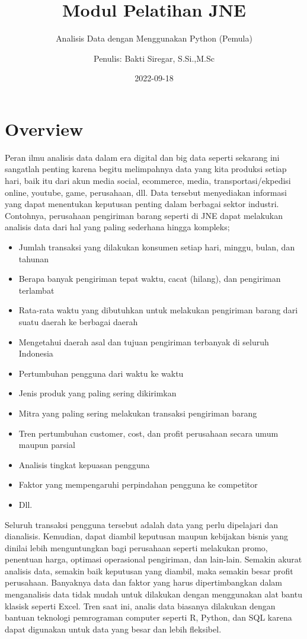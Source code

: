 \documentclass[
]{docs}
\title{Modul Pelatihan JNE}
\subtitle{Analisis Data dengan Menggunakan Python (Pemula)}
\author{Penulis: Bakti Siregar, S.Si.,M.Sc}
\date{2022-09-18}
\providecommand{\tightlist}{%
  \setlength{\itemsep}{0pt}\setlength{\parskip}{0pt}}
\begin{document}
\maketitle

{
\setcounter{tocdepth}{2}
\tableofcontents
}
\hypertarget{overview}{%
\section*{Overview}\label{overview}}

Peran ilmu analisis data dalam era digital dan big data seperti sekarang ini sangatlah penting karena begitu melimpahnya data yang kita produksi setiap hari, baik itu dari akun media social, ecommerce, media, transportasi/ekpedisi online, youtube, game, perusahaan, dll. Data tersebut menyediakan informasi yang dapat menentukan keputusan penting dalam berbagai sektor industri. Contohnya, perusahaan pengiriman barang seperti di JNE dapat melakukan analisis data dari hal yang paling sederhana hingga kompleks;

\begin{itemize}
\tightlist
\item
  Jumlah transaksi yang dilakukan konsumen setiap hari, minggu, bulan, dan tahunan
\item
  Berapa banyak pengiriman tepat waktu, cacat (hilang), dan pengiriman terlambat
\item
  Rata-rata waktu yang dibutuhkan untuk melakukan pengiriman barang dari suatu daerah ke berbagai daerah
\item
  Mengetahui daerah asal dan tujuan pengiriman terbanyak di seluruh Indonesia
\item
  Pertumbuhan pengguna dari waktu ke waktu
\item
  Jenis produk yang paling sering dikirimkan
\item
  Mitra yang paling sering melakukan transaksi pengiriman barang
\item
  Tren pertumbuhan customer, cost, dan profit perusahaan secara umum maupun parsial
\item
  Analisis tingkat kepuasan pengguna
\item
  Faktor yang mempengaruhi perpindahan pengguna ke competitor
\item
  Dll.
\end{itemize}

Seluruh transaksi pengguna tersebut adalah data yang perlu dipelajari dan dianalisis. Kemudian, dapat diambil keputusan maupun kebijakan bisnis yang dinilai lebih menguntungkan bagi perusahaan seperti melakukan promo, penentuan harga, optimasi operasional pengiriman, dan lain-lain. Semakin akurat analisis data, semakin baik keputusan yang diambil, maka semakin besar profit perusahaan. Banyaknya data dan faktor yang harus dipertimbangkan dalam menganalisis data tidak mudah untuk dilakukan dengan menggunakan alat bantu klasisk seperti Excel. Tren saat ini, analis data biasanya dilakukan dengan bantuan teknologi pemrograman computer seperti R, Python, dan SQL karena dapat digunakan untuk data yang besar dan lebih fleksibel.
\end{document}
